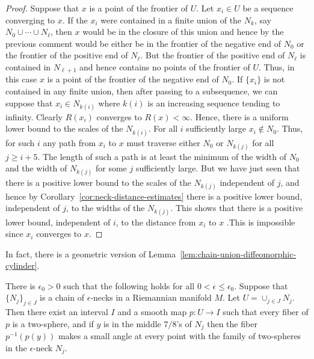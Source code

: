 \begin{proof}
Suppose that $x$ is a point of the frontier of $U$. Let $x_i\in U$
be a sequence converging to $x$. If the $x_i$ were contained in a
finite union of the $N_k$, say $N_0\cup\cdots\cup N_\ell$, then $x$
would be in the closure of this union and hence by the previous
comment would be either be in the frontier of the negative end of
$N_0$ or the frontier of the positive end of $N_\ell$. But the
frontier of the positive end of $N_\ell$ is contained in
$N_{\ell+1}$ and hence contains no points of the frontier of $U$.
Thus, in this case $x$ is a point of the frontier of the negative
end of $N_0$. If $\{x_i\}$ is not contained in any finite union,
then after passing to a subsequence, we can suppose that $x_i\in
N_{k(i)}$ where $k(i)$ is an increasing sequence tending to
infinity. Clearly $R(x_i)$ converges to $R(x)<\infty$. Hence, there
is a uniform lower bound to the scales of the $N_{k(i)}$. For all
$i$ sufficiently large $x_i\not\in N_0$. Thus, for such $i$ any path
from $x_i$ to $x$ must traverse either $N_0$ or $N_{k(j)}$ for all
$j\ge i+5$. The length of such a path is at least the minimum of the
width of $N_0$ and the width of $N_{k(j)}$ for some $j$ sufficiently
large. But we have just seen that there is a positive lower bound to
the scales of the $N_{k(j)}$ independent of $j$, and hence by
Corollary~\ref{cor:neck-distance-estimates} there is a positive lower bound, independent
of $j$, to the widths of the $N_{k(j)}$. This shows that there is a
positive lower bound, independent of $i$, to the distance from $x_i$
to $x$ .This is impossible since $x_i$ converges to $x$.
\end{proof}


 In fact, there is a geometric version of Lemma~\ref{lem:chain-union-diffeomorphic-cylinder}.

\begin{lemma}
\label{lem:chain-fibration-by-spheres}
There is $\epsilon_0>0$ such that  the following holds for all
$0<\epsilon\le \epsilon_0$. Suppose that $\{N_j\}_{j\in J}$ is a
chain of $\epsilon$-necks in a Riemannian manifold $M$. Let
$U=\cup_{j\in J}N_j$. Then there exist an interval $I$ and a smooth
map $p\colon U\to I$ such that every fiber of $p$ is a two-sphere,
and if $y$ is in the middle $7/8$'s of $N_j$ then the fiber
$p^{-1}(p(y))$ makes a small angle at every point with the family of
two-spheres in the $\epsilon$-neck $N_j$.
\end{lemma}



